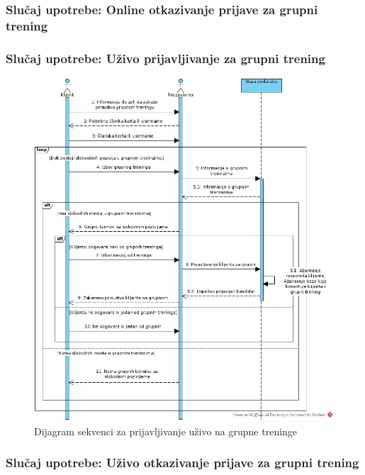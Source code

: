 \documentclass[../main.tex]{subfiles}
\begin{document}
\subsubsection{Slučaj upotrebe: Online otkazivanje prijave za grupni trening}


\subsubsection{Slučaj upotrebe: Uživo prijavljivanje za grupni trening}


\begin{figure}[!ht]
\begin{center}
\includegraphics[scale=0.55]{sections/images/dijagram_sekvenci_zakazivanje_grupnih_treninga_uzivo.jpg}
\end{center}
\caption{Dijagram sekvenci za prijavljivanje uživo na grupne treninge}
\label{fig:kontekst}
\end{figure}

\subsubsection{Slučaj upotrebe: Uživo otkazivanje prijave za grupni trening}

\end{document}
